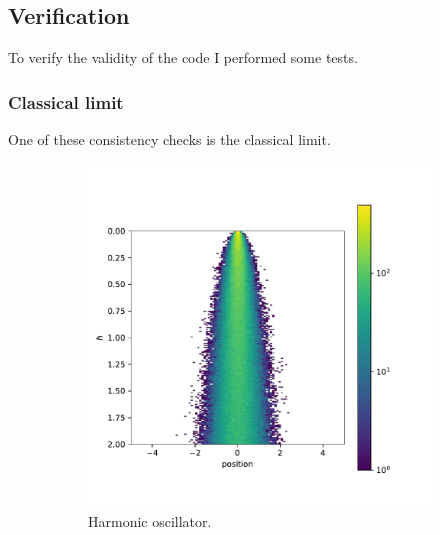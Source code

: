 \documentclass{scrartcl}
\begin{document}
	\subsection{Verification}
		\label{sec:verification}
		To verify the validity of the code I performed some tests.

	\subsubsection{Classical limit}
		One of these consistency checks is the classical limit.
		\begin{figure}[H]
			\centering
			\begin{subfigure}[c]{0.49\textwidth}
				\includegraphics[width=\textwidth]{../imgs/harmonic_oscillator_classical_limit/harmonic_oscillator_10_classical_limit.pdf}
				\caption{Harmonic oscillator.}
				\label{fig:harmonic_oscillator_classical_limit}
			\end{subfigure}
			\begin{subfigure}[c]{0.49\textwidth}

\end{subfigure}
\end{figure}
\end{document}
